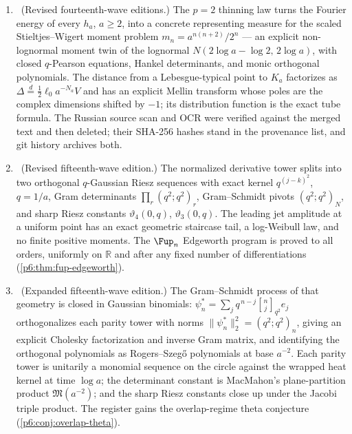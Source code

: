 \documentclass[11pt,oneside]{article}
\numberwithin{equation}{section}
\theoremstyle{definition}
\theoremstyle{remark}
\newcommand{\R}{\mathbb R}
\newcommand{\qbinom}[3]{\genfrac{[}{]}{0pt}{}{#1}{#2}_{#3}}
\begin{document}
\begin{enumerate}
\item \newflag\ (Revised fourteenth-wave editions.)  The $p=2$ thinning law
turns the Fourier energy of every $h_a$, $a\ge2$, into a concrete
representing measure for the scaled Stieltjes--Wigert moment problem
$m_n=a^{n(n+2)}/2^n$ --- an explicit non-lognormal moment twin of the
lognormal $N(2\log a-\log2,\,2\log a)$, with closed $q$-Pearson equations,
Hankel determinants, and monic orthogonal polynomials.  The distance from a
Lebesgue-typical point to $K_a$ factorizes as
$\Delta\overset d=\tfrac12\ell_0a^{-N_a}V$ and has an explicit Mellin
transform whose poles are the complex dimensions shifted by $-1$; its
distribution function is the exact tube formula.  The Russian source scan
and OCR were verified against the merged text and then deleted; their
SHA-256 hashes stand in the provenance list, and git history archives both.

\item \newflag\ (Revised fifteenth-wave edition.)  The normalized derivative
tower splits into two orthogonal $q$-Gaussian Riesz sequences with exact
kernel $q^{(j-k)^2}$, $q=1/a$, Gram determinants
$\prod_r(q^2;q^2)_r$, Gram--Schmidt pivots $(q^2;q^2)_N$, and sharp Riesz
constants $\vartheta_4(0,q)$, $\vartheta_3(0,q)$.  The leading jet amplitude
at a uniform point has an exact geometric staircase tail, a log-Weibull law,
and no finite positive moments.  The $\Fup_n$ Edgeworth program is proved to
all orders, uniformly on $\R$ and after any fixed number of
differentiations (\cref{p6:thm:fup-edgeworth}).

\item \newflag\ (Expanded fifteenth-wave edition.)  The Gram--Schmidt
process of that geometry is closed in Gaussian binomials:
$\psi_n^{\ast}=\sum_jq^{\,n-j}\qbinom{n}{j}{q^2}e_j$ orthogonalizes each
parity tower with norms $\|\psi_n^{\ast}\|_2^2=(q^2;q^2)_n$, giving an
explicit Cholesky factorization and inverse Gram matrix, and identifying
the orthogonal polynomials as Rogers--Szeg\H{o} polynomials at base
$a^{-2}$.  Each parity tower is unitarily a monomial sequence on the circle
against the wrapped heat kernel at time $\log a$; the determinant constant
is MacMahon's plane-partition product $\mathfrak M(a^{-2})$; and the sharp
Riesz constants close up under the Jacobi triple product.  The register
gains the overlap-regime theta conjecture
(\cref{p6:conj:overlap-theta}).


\end{enumerate}
\end{document}
